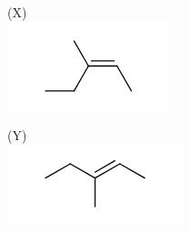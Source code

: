 \documentclass[10pt]{article}
\begin{document}
(X)\\
\includegraphics{smile-51e0713fbb70a71d230f7f66d15d00afcb4f8e10}

(Y)\\
\includegraphics{smile-41cb7f119ed15881f93112ef4b6ef8c90d4fd45d}
\end{document}
